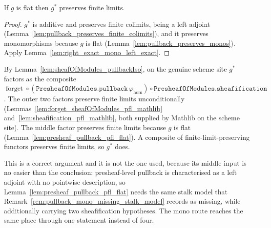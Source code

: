 \begin{lemma}
  \label{lem:pullback_preserves_finite_limits}
  If \(g\) is flat then \(g^*\) preserves finite limits.
\end{lemma}

\begin{proof}
  \(g^*\) is additive and preserves finite colimits, being a left adjoint
  (Lemma~\ref{lem:pullback_preserves_finite_colimits}), and it preserves monomorphisms because
  \(g\) is flat (Lemma~\ref{lem:pullback_preserves_monos}). Apply
  Lemma~\ref{lem:right_exact_mono_left_exact}.
\end{proof}

\begin{remark}
  \label{rem:pullback_pfl_three_factor_route}
  By Lemma~\ref{lem:sheafOfModules_pullbackIso}, on the genuine scheme site \(g^*\)
  factors as the composite
  \(\operatorname{forget} \circ
  (\texttt{PresheafOfModules.pullback}\,\varphi_{\mathrm{hom}}) \circ
  \texttt{PresheafOfModules.sheafification}\). The outer two factors preserve finite
  limits unconditionally (Lemmas~\ref{lem:forget_sheafOfModules_pfl_mathlib}
  and~\ref{lem:sheafification_pfl_mathlib}, both supplied by Mathlib on the scheme
  site). The middle factor preserves finite limits because \(g\) is flat
  (Lemma~\ref{lem:presheaf_pullback_pfl_flat}). A composite of
  finite-limit-preserving functors preserves finite limits, so \(g^*\) does.

  This is a correct argument and it is not the one used, because its middle input is no easier
  than the conclusion: presheaf-level pullback is characterised as a left adjoint with no
  pointwise description, so Lemma~\ref{lem:presheaf_pullback_pfl_flat} needs the same stalk
  model that Remark~\ref{rem:pullback_mono_missing_stalk_model} records as missing, while
  additionally carrying two sheafification hypotheses. The mono route reaches the same place
  through one statement instead of four.
\end{remark}

